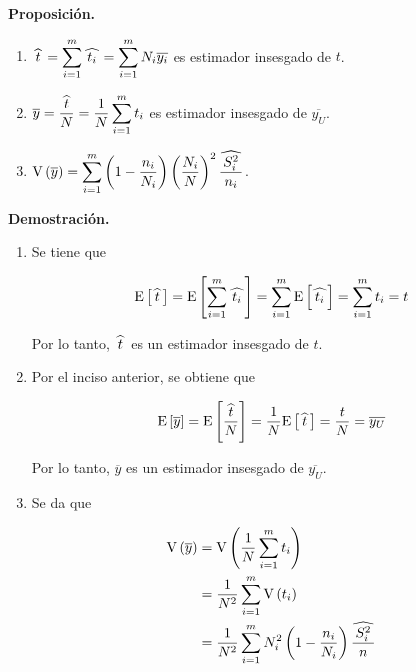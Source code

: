 \documentclass[12pt, fleqn]{article}
\newcommand{\gorro}[1]{\widehat{\hspace{0.7mm} #1 \hspace{0.7mm}}}
\newcommand{\E}[1]{\mathrm{E} \left[ #1 \right]}
\newcommand{\V}[1]{\mathrm{V} \left( #1 \right)}
\begin{document}
    \textbf{Proposición.}  
        \begin{enumerate}
            \item $ \displaystyle \gorro{t} = \sum_{i=1}^{m} \gorro{t_i} = \sum_{i=1}^{m} N_i \overline{y_i} $ es estimador insesgado de $t$.
            \item $ \displaystyle \overline{y} = \dfrac{\gorro{t}}{N} = \dfrac{1}{N} \sum_{i=1}^{m} t_i $ es estimador insesgado de $ \overline{y_U} $.
            \item $ \displaystyle \V{\overline{y}} = \sum_{i=1}^{m} \left( 1 - \dfrac{n_i}{N_i} \right) \left( \dfrac{N_i}{N} \right)^2 \dfrac{\gorro{S_i^2}}{n_i} $.
        \end{enumerate}

    \textbf{Demostración.} 

    \begin{enumerate}
        \item Se tiene que
        
        \begin{align*}
            \E{\gorro{t}} = \E{\sum_{i=1}^{m} \gorro{t_i}} = \sum_{i=1}^{m} \E{\gorro{t_i}} = \sum_{i=1}^{m} t_i = t
        \end{align*}

        Por lo tanto, $ \gorro{t} $ es un estimador insesgado de $t$.

        \item Por el inciso anterior, se obtiene que
        
        \begin{align*}
            \E{\overline{y}} = \E{\dfrac{\gorro{t}}{N}} = \dfrac{1}{N} \E{\gorro{t}} = \dfrac{t}{N} = \overline{y_U}
        \end{align*}

        Por lo tanto, $ \overline{y} $ es un estimador insesgado de $ \overline{y_U} $.

        \item Se da que
        
        \begin{align*}
            \V{\overline{y}} &= \V{\dfrac{1}{N} \sum_{i=1}^{m} t_i} \\
            &= \dfrac{1}{N^2} \sum_{i=1}^{m} \V{t_i} \\
            &= \dfrac{1}{N^2} \sum_{i=1}^{m} N_i^2 \left( 1 - \dfrac{n_i}{N_i} \right) \dfrac{\gorro{S_i^2}}{n} \\
        \end{align*}
    \end{enumerate}
\end{document}
